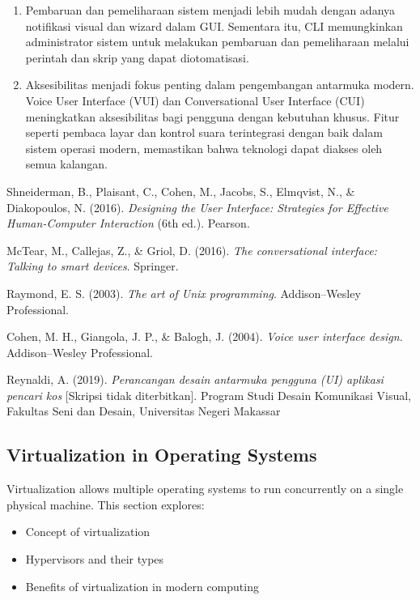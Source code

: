\documentclass[12pt]{article}
\begin{document}
\begin{enumerate}
  \item {Pembaruan dan pemeliharaan sistem }  
    menjadi lebih mudah dengan adanya notifikasi visual dan wizard dalam GUI. Sementara itu, CLI memungkinkan administrator sistem untuk melakukan pembaruan dan pemeliharaan melalui perintah dan skrip yang dapat diotomatisasi.


 \item{Aksesibilitas} 
    menjadi fokus penting dalam pengembangan antarmuka modern. Voice User Interface (VUI) dan Conversational User Interface (CUI) meningkatkan aksesibilitas bagi pengguna dengan kebutuhan khusus. Fitur seperti pembaca layar dan kontrol suara terintegrasi dengan baik dalam sistem operasi modern, memastikan bahwa teknologi dapat diakses oleh semua kalangan.
\end{enumerate}

\begin{thebibliography}{9} 

Shneiderman, B., Plaisant, C., Cohen, M., Jacobs, S., Elmqvist, N., \& Diakopoulos, N. (2016). \textit{Designing the User Interface: Strategies for Effective Human-Computer Interaction} (6th ed.). Pearson.

McTear, M., Callejas, Z., \& Griol, D. (2016). \textit{The conversational interface: Talking to smart devices}. Springer.

Raymond, E. S. (2003). \textit{The art of Unix programming}. Addison--Wesley Professional. 

Cohen, M. H., Giangola, J. P., \& Balogh, J. (2004). \textit{Voice user interface design}. Addison--Wesley Professional.

Reynaldi, A. (2019). \textit{Perancangan desain antarmuka pengguna (UI) aplikasi pencari kos} [Skripsi tidak diterbitkan]. Program Studi Desain Komunikasi Visual, Fakultas Seni dan Desain, Universitas Negeri Makassar


			

\end{thebibliography}




\subsection{Virtualization in Operating Systems}
Virtualization allows multiple operating systems to run concurrently on a single physical machine. This section explores:
\begin{itemize}
    \item Concept of virtualization
    \item Hypervisors and their types
    \item Benefits of virtualization in modern computing
\end{itemize}
\end{document}
